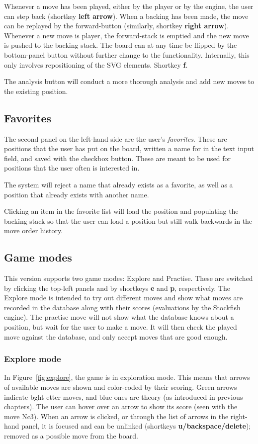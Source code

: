 \documentclass[architecture.tex]{subfiles}
\begin{document}
Whenever a move has been played, either by the player or by the engine,
the user can step back (shortkey \textbf{left arrow}). When a backing has been made, the move can be
replayed by the forward-button (similarly, shortkey \textbf{right arrow}).
Whenever a new move is player, the forward-stack is emptied and
the new move is pushed to the backing stack.
The board can at any time be flipped by the bottom-panel button without
further change to the functionality. Internally, this only involves
repositioning of the SVG elements. Shortkey \textbf{f}.

The analysis button will conduct a more thorough
analysis and add new moves to the existing position.
\subsection{Favorites}
The second panel on the left-hand side are the user's \textit{favorites}.
These are positions that the user has put on the board, written a name
for in the text input field, and saved with the checkbox button.
These are meant to be used for positions that the user often is interested in.

The system will reject a name that already exists as a favorite,
as well as a position that already exists with another name.

Clicking an item in the favorite list will load the position and populating
the backing stack so that the user can load a position but still walk
backwards in the move order history.
\subsection{Game modes}
\label{section:gamemodes}
This version supports two game modes: Explore and Practise.
These are switched by clicking the top-left panels and by shortkeys
\textbf{e} and \textbf{p}, respectively.
The Explore mode is intended to try out different moves and show what
moves are recorded in the database along with their scores
(evaluations by the Stockfish engine).
The practise move will not show what the database knows about a position,
but wait for the user to make a move. It will then check the played move
against the database, and only accept moves that are good enough.
\subsubsection{Explore mode}
In Figure~\ref{fig:explore}, the game is in exploration mode. This means
that arrows of available moves are shown and color-coded by their scoring.
Green arrows indicate bght
etter moves, and blue ones are theory (as introduced
in previous chapters). The user can hover over an arrow to show its score
(seen with the move Nc3).
When an arrow is clicked, or through the list of arrows in the right-hand panel,
it is focused and can be unlinked (shortkeys \textbf{u/backspace/delete});
removed as a possible move from the board.
\end{document}
